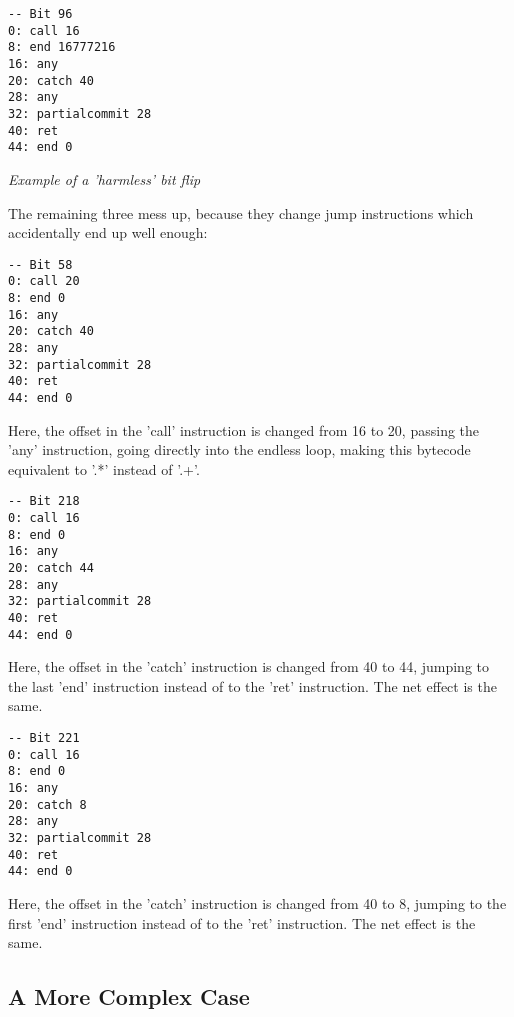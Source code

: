\begin{myquote}
\begin{verbatim}
-- Bit 96
0: call 16
8: end 16777216
16: any
20: catch 40
28: any
32: partialcommit 28
40: ret
44: end 0

\end{verbatim}
\end{myquote}
\textit{Example of a 'harmless' bit flip}

The remaining three mess up, because they change jump instructions
which accidentally end up well enough:

\begin{myquote}
\begin{verbatim}
-- Bit 58
0: call 20
8: end 0
16: any
20: catch 40
28: any
32: partialcommit 28
40: ret
44: end 0

\end{verbatim}
\end{myquote}

Here, the offset in the 'call' instruction is changed from 16 to 20, passing
the 'any' instruction, going directly into the endless loop, making this
bytecode equivalent to '.*' instead of '.+'.

\begin{myquote}
\begin{verbatim}
-- Bit 218
0: call 16
8: end 0
16: any
20: catch 44
28: any
32: partialcommit 28
40: ret
44: end 0

\end{verbatim}
\end{myquote}

Here, the offset in the 'catch' instruction is changed from 40 to 44,
jumping to the last 'end' instruction instead of to the 'ret' instruction.
The net effect is the same.

\begin{myquote}
\begin{verbatim}
-- Bit 221
0: call 16
8: end 0
16: any
20: catch 8
28: any
32: partialcommit 28
40: ret
44: end 0

\end{verbatim}
\end{myquote}

Here, the offset in the 'catch' instruction is changed from 40 to 8,
jumping to the first 'end' instruction instead of to the 'ret' instruction.
The net effect is the same.

\subsection{A More Complex Case}

